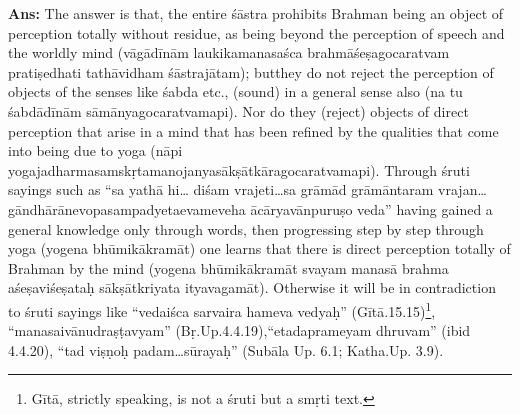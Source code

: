 \textbf{Ans:} The answer is that, the entire śāstra prohibits Brahman being an object of perception totally without residue, as being beyond the perception of speech and the worldly mind (vāgādīnām laukikamanasaśca brahmāśeṣagocaratvam pratiṣedhati tathāvidham śāstrajātam); but\break they do not reject the perception of objects of the senses like śabda etc., (sound) in a general sense also (na tu śabdādīnām sāmānyagocaratvamapi). Nor do they (reject) objects of direct perception that arise in a mind that has been refined by the qualities that come into being due to yoga (nāpi yogajadharmasamskṛtamanojanyasākṣātkāragocaratvamapi). Through śruti sayings such as “sa yathā hi… diśam vrajeti…sa grāmād grāmāntaram vrajan…gāndhārānevopasampadyeta\break evameveha ācāryavānpuruṣo veda” having gained a general knowledge only through words, then progressing step by step through yoga (yogena bhūmikākramāt) one learns that there is direct perception totally of Brahman by the mind (yogena bhūmikākramāt svayam manasā brahma aśeṣaviśeṣataḥ sākṣātkriyata ityavagamāt). Otherwise it will be in contradiction to śruti sayings like “vedaiśca sarvaira hameva vedyaḥ” (Gītā.15.15)\footnote{Gītā, strictly speaking, is not a śruti but a smṛti text.}, “manasaivānudraṣṭavyam” (Bṛ.Up.4.4.19),\break “etadaprameyam dhruvam” (ibid 4.4.20), “tad viṣṇoḥ padam…sūrayaḥ” (Subāla Up. 6.1; Katha.Up. 3.9).




